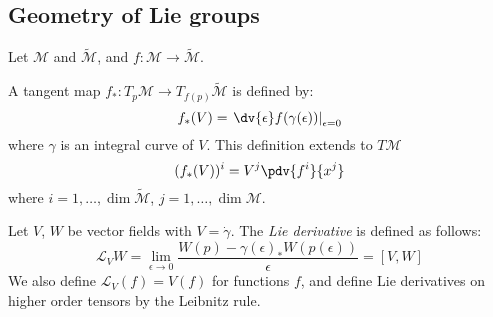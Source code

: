 \documentclass{jknotes}
\begin{document}
\subsection{Geometry of Lie groups}
Let \(\mathcal{M}\) and \(\tilde{\mathcal{M}}\), and \(f:\mathcal{M}\to\tilde{\mathcal{M}}\).
\begin{defn}
    A tangent map \(f_*:T_p\mathcal{M}\to T_{f(p)}\tilde{\mathcal{M}}\) is defined by:
    \begin{equation}
        f_*(V) = \left.\dv{\epsilon} f(\gamma(\epsilon))\right|_{\epsilon=0}
    \end{equation}
    where \(\gamma\) is an integral curve of \(V\). This definition extends to \(T\mathcal{M}\)
    \begin{equation}
        (f_*(V))^i = V^j\pdv{f^i}{x^j}
    \end{equation}
    where \(i = 1,\dots,\dim\tilde{\mathcal{M}}\), \(j=1,\dots,\dim\mathcal{M}\).
\end{defn}
\begin{defn}
    Let \(V\), \(W\) be vector fields with \(V = \dot{\gamma}\). The \emph{Lie derivative} is defined as follows:
    \begin{equation}
        \mathcal{L}_VW = \lim_{\epsilon\to0} \frac{W(p) - \gamma(\epsilon)_*W(p(\epsilon))}{\epsilon} = [V,W]
    \end{equation}
    We also define \(\mathcal{L}_V(f) = V(f)\) for functions \(f\), and define Lie derivatives on higher order tensors by the Leibnitz rule.
\end{defn}
\end{document}
